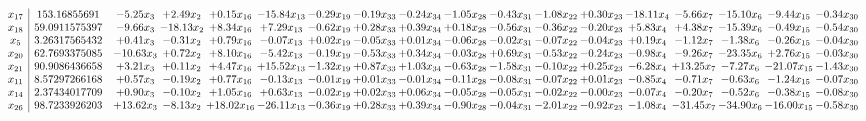 \documentclass[9pt]{article}
\begin{document}
 \[\begin{array}{c| c c@{\hskip 2pt} c@{\hskip 2pt} c@{\hskip 2pt} c@{\hskip 2pt} c@{\hskip 2pt} c@{\hskip 2pt} c@{\hskip 2pt} c@{\hskip 2pt} c@{\hskip 2pt} c@{\hskip 2pt} c@{\hskip 2pt} c@{\hskip 2pt} c@{\hskip 2pt} c@{\hskip 2pt} c@{\hskip 2pt} c@{\hskip 2pt} }
 x_{17}   &  153.16855691 & -5.25 x_{3} & +  2.49 x_{2} & +  0.15 x_{16} & -15.84 x_{13} & -0.29 x_{19} & -0.19 x_{33} & -0.24 x_{34} & -1.05 x_{28} & -0.43 x_{31} & -1.08 x_{22} & +  0.30 x_{23} & -18.11 x_{4} & -5.66 x_{7} & -15.10 x_{6} & -9.44 x_{15} & -0.34 x_{30}\\
 x_{18}   &  59.0911575397 & -9.66 x_{3} & -18.13 x_{2} & +  8.34 x_{16} & +  7.29 x_{13} & -0.62 x_{19} & +  0.28 x_{33} & +  0.39 x_{34} & +  0.18 x_{28} & -0.56 x_{31} & -0.36 x_{22} & -0.20 x_{23} & +  5.83 x_{4} & +  4.38 x_{7} & -15.39 x_{6} & -0.49 x_{15} & -0.54 x_{30}\\
 x_{5}   &  3.26317565432 & +  0.41 x_{3} & -0.31 x_{2} & +  0.79 x_{16} & -0.07 x_{13} & +  0.02 x_{19} & -0.05 x_{33} & +  0.01 x_{34} & -0.06 x_{28} & -0.02 x_{31} & -0.07 x_{22} & -0.04 x_{23} & +  0.19 x_{4} & -1.12 x_{7} & -1.38 x_{6} & -0.26 x_{15} & -0.04 x_{30}\\
 x_{20}   &  62.7693375085 & -10.63 x_{3} & +  0.72 x_{2} & +  8.10 x_{16} & -5.42 x_{13} & -0.19 x_{19} & -0.53 x_{33} & +  0.34 x_{34} & -0.03 x_{28} & +  0.69 x_{31} & -0.53 x_{22} & -0.24 x_{23} & -0.98 x_{4} & -9.26 x_{7} & -23.35 x_{6} & +  2.76 x_{15} & -0.03 x_{30}\\
 x_{21}   &  90.9086436658 & +  3.21 x_{3} & +  0.11 x_{2} & +  4.47 x_{16} & + 15.52 x_{13} & -1.32 x_{19} & +  0.87 x_{33} & +  1.03 x_{34} & -0.63 x_{28} & -1.58 x_{31} & -0.10 x_{22} & +  0.25 x_{23} & -6.28 x_{4} & + 13.25 x_{7} & -7.27 x_{6} & -21.07 x_{15} & -1.43 x_{30}\\
 x_{11}   &  8.57297266168 & +  0.57 x_{3} & -0.19 x_{2} & +  0.77 x_{16} & -0.13 x_{13} & -0.01 x_{19} & +  0.01 x_{33} & -0.01 x_{34} & -0.11 x_{28} & -0.08 x_{31} & -0.07 x_{22} & +  0.01 x_{23} & -0.85 x_{4} & -0.71 x_{7} & -0.63 x_{6} & -1.24 x_{15} & -0.07 x_{30}\\
 x_{14}   &  2.37434017709 & +  0.90 x_{3} & -0.10 x_{2} & +  1.05 x_{16} & +  0.63 x_{13} & -0.02 x_{19} & +  0.02 x_{33} & +  0.06 x_{34} & -0.05 x_{28} & -0.05 x_{31} & -0.02 x_{22} & -0.00 x_{23} & -0.07 x_{4} & -0.20 x_{7} & -0.52 x_{6} & -0.38 x_{15} & -0.08 x_{30}\\
 x_{26}   &  98.7233926203 & + 13.62 x_{3} & -8.13 x_{2} & + 18.02 x_{16} & -26.11 x_{13} & -0.36 x_{19} & +  0.28 x_{33} & +  0.39 x_{34} & -0.90 x_{28} & -0.04 x_{31} & -2.01 x_{22} & -0.92 x_{23} & -1.08 x_{4} & -31.45 x_{7} & -34.90 x_{6} & -16.00 x_{15} & -0.58 x_{30}\\

\end{array}\]
\end{document}
